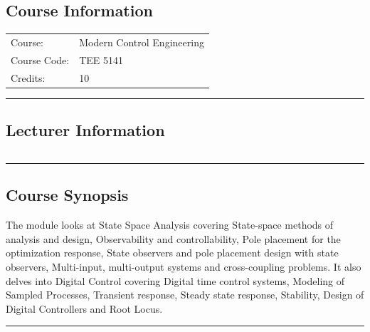 
\subsection*{Course Information}
\vspace{0ex}%
\noindent\parbox{0.5\textwidth}{%
    \noindent\begin{tabular}{@{}ll}
                 \textsf{Course:}          & 	Modern Control Engineering  \\
                 \textsf{Course Code:}         & 	TEE 5141    \\
                 \textsf{Credits:}    & 	10
    \end{tabular}}
\vspace{2ex}\hrule\vspace{2ex}

\subsection*{Lecturer Information}
\noindent\parbox{0.5\textwidth}{%
    \noindent\begin{tabular}{@{}ll}
                 
    \end{tabular}}
\vspace{2ex}\hrule\vspace{2ex}


\subsection*{Course Synopsis}
The module looks at State Space Analysis covering State-space methods of analysis and design, Observability and controllability, Pole placement for the optimization response, State observers and pole placement design with state observers, Multi-input, multi-output systems and cross-coupling problems.
It also delves into Digital Control covering Digital time control systems, Modeling of Sampled Processes, Transient response, Steady state response, Stability, Design of Digital Controllers and Root Locus.
\vspace{2ex} \hrule\vspace{2ex}


